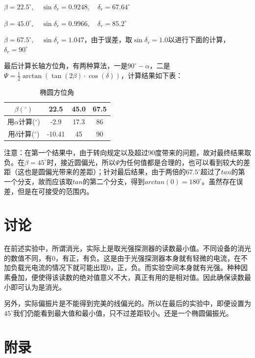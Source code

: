 \documentclass[12pt]{article}
\begin{document}
$\beta = 22.5^\circ, \quad \sin{\delta_r}=0.9248, \quad \delta_r = 67.64^\circ$

$\beta = 45.0^\circ, \quad \sin{\delta_r}=0.9966, \quad \delta_r = 85.2^\circ$

$\beta = 67.5^\circ, \quad \sin{\delta_r}=1.047$，由于误差，取$\sin{\delta_r}=1.0$以进行下面的计算，$\delta_r = 90^\circ$

最后计算长轴方位角，有两种算法，一是$90^\circ-\alpha$，二是$\Psi = \frac{1}{2}\arctan{(\tan{(2\beta)} \cdot \cos(\delta))}$，计算结果如下表：

\begin{table}[H]
    \centering
    \begin{tabular}{|c|c|c|c|}
    \hline
    $\beta(^\circ)$       & 22.5   & 45.0 & 67.5 \\ \hline
    用$\alpha$计算($^\circ$) & -2.9   & 17.3 & 86   \\ \hline
    用$\delta$计算($^\circ$) & -10.41 & 45   & 90   \\ \hline
    \end{tabular}
    \caption{椭圆方位角}
    \label{tab:A6}
\end{table}

注意：在第一个结果中，由于转向规定以及超过90度带来的问题，故对最终结果取负。在$\beta=45^\circ$时，接近圆偏光，所以$\Psi$为任何值都是合理的，也可以看到较大的差距（这也是圆偏光带来的差距）；针对最后结果，由于两倍的$67.5^\circ$超过了$tan$的第一个分支，故而应该取$tan$的第二个分支，得到$arctan(0)=180^\circ$。虽然存在误差，但是在可接受的范围内。

\section{讨论}

在前述实验中，所谓消光，实际上是取光强探测器的读数最小值。不同设备的消光的数值不同，有0，有正，有负。这是由于光强探测器本身就有轻微的电流，在不加负载光电流的情况下就可能出现0，正，负。而实验空间本身就有光强。种种因素叠加，便使得该读数的绝对值意义不大，真正有用的是相对值。因此确保读数最小即可认为是消光。

另外，实际偏振片是不能得到完美的线偏光的。所以在最后的实验中，即便设置为$45^\circ$我们仍能看到最大值和最小值，只不过差距较小。还是一个椭圆偏振光。

\clearpage
\appendix
\section{附录}
\end{document}
